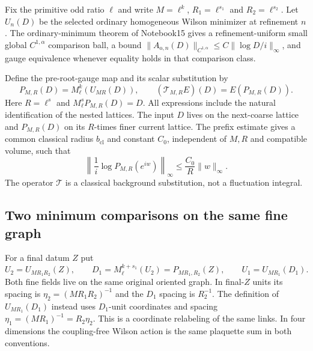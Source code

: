 \documentclass[11pt]{article}
\theoremstyle{remark}
\begin{document}
Fix the primitive odd ratio $\ell$ and write
$M=\ell^k$, $R_1=\ell^{s_1}$ and $R_2=\ell^{s_2}$.
Let $U_n(D)$ be the selected ordinary homogeneous Wilson
minimizer at refinement $n$. The ordinary-minimum theorem
of Notebook15 gives a refinement-uniform small global
$C^{1,\alpha}$ comparison ball, a bound
$\|A_{\mathrm o,n}(D)\|_{C^{1,\alpha}}
\le C\|\log D/i\|_\infty$, and gauge equivalence whenever
equality holds in that comparison class.

Define the pre-root-gauge map and its scalar substitution by
\begin{equation}
 P_{M,R}(D)=M_\ell^k(U_{MR}(D)),\qquad
 (\mathcal T_{M,R}E)(D)=E(P_{M,R}(D)).
 \label{csg-maps}
\end{equation}
Here $R=\ell^s$ and $M_\ell^sP_{M,R}(D)=D$.
All expressions include the natural identification of the
nested lattices. The input $D$ lives on the next-coarse
lattice and $P_{M,R}(D)$ on its $R$-times finer current
lattice. The prefix estimate gives a common classical
radius $b_{\mathrm{cl}}$ and constant $C_0$, independent of
$M,R$ and compatible volume, such that
\begin{equation}
 \left\|\frac1i\log P_{M,R}(e^{iw})\right\|_\infty
                \le\frac{C_0}{R}\|w\|_\infty.
 \label{csg-amplitude}
\end{equation}
The operator $\mathcal T$ is a classical background
substitution, not a fluctuation integral.

\subsection{Two minimum comparisons on the same fine graph}
\label{csg-comparison-section}

For a final datum $Z$ put
\begin{equation}
 U_2=U_{MR_1R_2}(Z),\qquad
 D_1=M_\ell^{k+s_1}(U_2)=P_{MR_1,R_2}(Z),\qquad
 U_1=U_{MR_1}(D_1).
 \label{csg-fields}
\end{equation}
Both fine fields live on the same original oriented graph.
In final-$Z$ units its spacing is
$\eta_2=(MR_1R_2)^{-1}$ and the $D_1$ spacing is $R_2^{-1}$.
The definition of $U_{MR_1}(D_1)$ instead uses $D_1$-unit
coordinates and spacing $\eta_1=(MR_1)^{-1}=R_2\eta_2$.
This is a coordinate relabeling of the same links. In four
dimensions the coupling-free Wilson action is the same
plaquette sum in both conventions.
\end{document}
